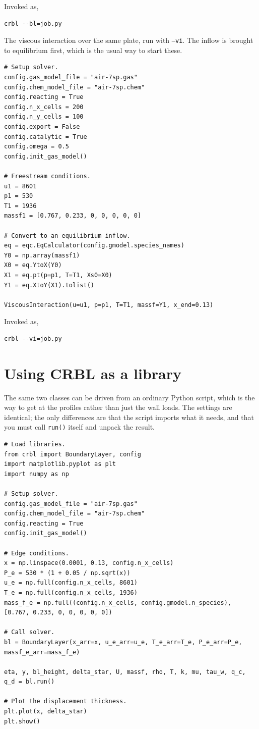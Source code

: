 \documentclass[10pt,a4paper]{article}
\renewcommand{\_}{\origunderscore\penalty4000\relax}
\begin{document}
Invoked as,
\begin{lstlisting}[style=plain]
crbl --bl=job.py
\end{lstlisting}

The viscous interaction over the same plate, run with \texttt{--vi}. The inflow is brought to equilibrium first, which is the usual way to start these.

\begin{lstlisting}
# Setup solver.
config.gas_model_file = "air-7sp.gas"
config.chem_model_file = "air-7sp.chem"
config.reacting = True
config.n_x_cells = 200
config.n_y_cells = 100
config.export = False
config.catalytic = True
config.omega = 0.5
config.init_gas_model()

# Freestream conditions.
u1 = 8601
p1 = 530
T1 = 1936
massf1 = [0.767, 0.233, 0, 0, 0, 0, 0]

# Convert to an equilibrium inflow.
eq = eqc.EqCalculator(config.gmodel.species_names)
Y0 = np.array(massf1)
X0 = eq.YtoX(Y0)
X1 = eq.pt(p=p1, T=T1, Xs0=X0)
Y1 = eq.XtoY(X1).tolist()

ViscousInteraction(u=u1, p=p1, T=T1, massf=Y1, x_end=0.13)
\end{lstlisting}

Invoked as,
\begin{lstlisting}[style=plain]
crbl --vi=job.py
\end{lstlisting}

\section*{Using CRBL as a library}
\label{sec:library}

The same two classes can be driven from an ordinary Python script, which is the way to get at the profiles rather than just the wall loads. The settings are identical; the only differences are that the script imports what it needs, and that you must call \texttt{run()} itself and unpack the result.

\begin{lstlisting}
# Load libraries.
from crbl import BoundaryLayer, config
import matplotlib.pyplot as plt
import numpy as np

# Setup solver.
config.gas_model_file = "air-7sp.gas"
config.chem_model_file = "air-7sp.chem"
config.reacting = True
config.init_gas_model()

# Edge conditions.
x = np.linspace(0.0001, 0.13, config.n_x_cells)
P_e = 530 * (1 + 0.05 / np.sqrt(x))
u_e = np.full(config.n_x_cells, 8601)
T_e = np.full(config.n_x_cells, 1936)
mass_f_e = np.full((config.n_x_cells, config.gmodel.n_species), [0.767, 0.233, 0, 0, 0, 0, 0])

# Call solver.
bl = BoundaryLayer(x_arr=x, u_e_arr=u_e, T_e_arr=T_e, P_e_arr=P_e, massf_e_arr=mass_f_e)

eta, y, bl_height, delta_star, U, massf, rho, T, k, mu, tau_w, q_c, q_d = bl.run()

# Plot the displacement thickness.
plt.plot(x, delta_star)
plt.show()
\end{lstlisting}
\end{document}
